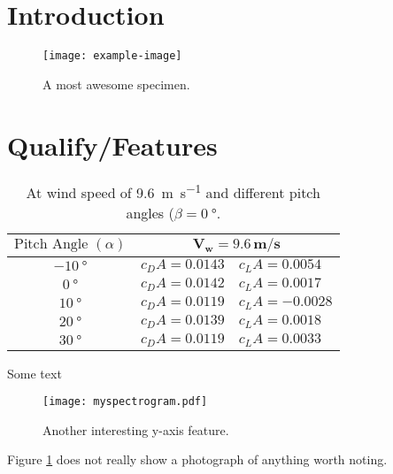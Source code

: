\documentclass[journal,comsoc]{IEEEtran}
\begin{document}
\renewcommand{\thetable}{\arabic{table}}
\renewcommand \thesection{\arabic{section}} %

\section{Introduction}

\lipsum[2]

\begin{figure}[thb]
	\centering  
	\texttt{[image: example-image]}
	\caption{A most awesome specimen.}
	\label{fig:graysquare}
\end{figure}

\section{Qualify/Features}

\lipsum[1]


\begin{table}
	\centering
	\begin{tabular}{|c|l|l|}
	\hline
	\textbf{$\text{Pitch Angle } (\alpha)$}&\multicolumn{2}{c|}{$\mathbf{V_w=9.6\,m/s}$}\\
	\hline
	$\SI{-10}{\degree}$&$c_DA=0.0143$&$c_LA=0.0054$\\
	\hline
	$\SI{0}{\degree}$&$c_DA=0.0142$&$c_LA=0.0017$\\
	\hline
	$\SI{10}{\degree}$&$c_DA=0.0119$&$c_LA=-0.0028$\\
	\hline
	$\SI{20}{\degree}$&$c_DA=0.0139$&$c_LA=0.0018$\\
	\hline
	$\SI{30}{\degree}$&$c_DA=0.0119$&$c_LA=0.0033$\\
	\hline
	\end{tabular}
	\caption{At wind speed of \SI{9.6}{\meter\per\second} and different pitch angles ($\beta=\SI{0}{\degree}$.}
	\label{table:draglift1}
\end{table}

Some text

\begin{figure}[thb]
	\centering  
	\texttt{[image: myspectrogram.pdf]}
	\caption{Another interesting y-axis feature.}
	\label{fig:specgram}
\end{figure}

Figure \ref{fig:graysquare} does not really show a photograph of anything worth noting.  \lipsum
\end{document}
